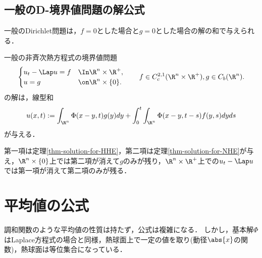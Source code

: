\documentclass[uplatex,dvipdfmx]{jsreport}
\begin{document}
\subsection{一般のD-境界値問題の解公式}

\begin{tcolorbox}[colframe=ForestGreen, colback=ForestGreen!10!white,breakable,colbacktitle=ForestGreen!40!white,coltitle=black,fonttitle=\bfseries\sffamily,
title=]
一般のDirichlet問題は，$f=0$とした場合と$g=0$とした場合の解の和で与えられる．
\end{tcolorbox}

\begin{corollary}[重ね合わせの原理]
    一般の非斉次熱方程式の境界値問題
    \[\begin{cases}
        u_t-\Lap u=f&\In\R^n\times\R^+,\\
        u=g&\on\R^n\times\{0\}.
    \end{cases}\qquad f\in C^{2,1}_c(\R^n\times\R^+),g\in C_b(\R^n).\]
    の解は，線型和
    \[u(x,t):=\int_{\R^n}\Phi(x-y,t)g(y)dy+\int^t_0\int_{\R^n}\Phi(x-y,t-s)f(y,s)dyds\]
    が与える．
\end{corollary}
\begin{Proof}
    第一項は定理\ref{thm-solution-for-HHE}，第二項は定理\ref{thm-solution-for-NHE}が与え，$\R^n\times\{0\}$上では第二項が消えて$g$のみが残り，$\R^n\times\R^+$上での$u_t-\Lap u$では第一項が消えて第二項のみが残る．
\end{Proof}

\section{平均値の公式}

\begin{tcolorbox}[colframe=ForestGreen, colback=ForestGreen!10!white,breakable,colbacktitle=ForestGreen!40!white,coltitle=black,fonttitle=\bfseries\sffamily,
title=]
    調和関数のような平均値の性質は持たず，公式は複雑になる．
    しかし，基本解$\Phi$はLaplace方程式の場合と同様，熱球面上で一定の値を取り(動径$\abs{x}$の関数)，熱球面は等位集合になっている．
\end{tcolorbox}
\end{document}
